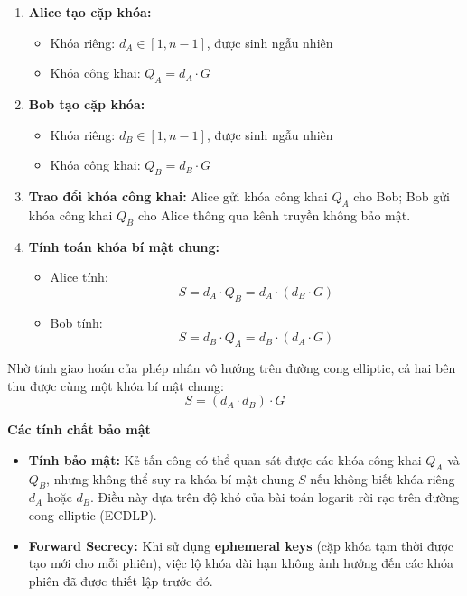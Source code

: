 \begin{enumerate}
    \item \textbf{Alice tạo cặp khóa:}
    \begin{itemize}
        \item Khóa riêng: $d_A \in [1, n-1]$, được sinh ngẫu nhiên
        \item Khóa công khai: $Q_A = d_A \cdot G$
    \end{itemize}
    
    \item \textbf{Bob tạo cặp khóa:}
    \begin{itemize}
        \item Khóa riêng: $d_B \in [1, n-1]$, được sinh ngẫu nhiên
        \item Khóa công khai: $Q_B = d_B \cdot G$
    \end{itemize}
    
    \item \textbf{Trao đổi khóa công khai:}  
    Alice gửi khóa công khai $Q_A$ cho Bob; Bob gửi khóa công khai $Q_B$ cho Alice thông qua kênh truyền không bảo mật.
    
    \item \textbf{Tính toán khóa bí mật chung:}
    \begin{itemize}
        \item Alice tính:
        \[
        S = d_A \cdot Q_B = d_A \cdot (d_B \cdot G)
        \]
        \item Bob tính:
        \[
        S = d_B \cdot Q_A = d_B \cdot (d_A \cdot G)
        \]
    \end{itemize}
\end{enumerate}

Nhờ tính giao hoán của phép nhân vô hướng trên đường cong elliptic, cả hai bên thu được cùng một khóa bí mật chung:
\[
S = (d_A \cdot d_B) \cdot G
\]

\textbf{Các tính chất bảo mật}

\begin{itemize}
    \item \textbf{Tính bảo mật:}  
    Kẻ tấn công có thể quan sát được các khóa công khai $Q_A$ và $Q_B$, nhưng không thể suy ra khóa bí mật chung $S$ nếu không biết khóa riêng $d_A$ hoặc $d_B$. Điều này dựa trên độ khó của bài toán logarit rời rạc trên đường cong elliptic (ECDLP).
    
    \item \textbf{Forward Secrecy:}  
    Khi sử dụng \textbf{ephemeral keys} (cặp khóa tạm thời được tạo mới cho mỗi phiên), việc lộ khóa dài hạn không ảnh hưởng đến các khóa phiên đã được thiết lập trước đó.
\end{itemize}

